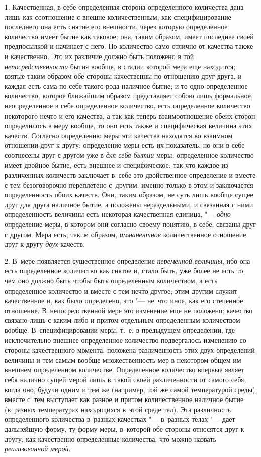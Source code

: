 1. Качественная, в себе определенная сторона определенного количества дана лишь
как соотношение с внешне количественным; как специфицирование последнего она
есть снятие его внешности, через которую определенное количество имеет бытие
как таковое; она, таким образом, имеет последнее своей предпосылкой и начинает
с него. Но количество само отлично от качества также и качественно. Это их
различие должно быть положено в той {\em непосредственности} бытия вообще, в
стадии которой мера еще находится; взятые таким образом обе стороны качественны
по отношению друг друга, и каждая есть сама по себе такого рода наличное бытие;
и то одно определенное количество, которое ближайшим образом представляет собою
лишь формальное, неопределенное в себе определенное количество, есть
определенное количество некоторого нечто и его качества, а так как теперь
взаимоотношение обеих сторон определилось в меру вообще, то оно есть также и
специфическая величина этих качеств. Согласно определению меры эти качества
находятся во взаимном отношении друг к другу; определение меры есть их
показатель; но они в себе соотнесены друг с другом уже в {\em для-себя-бытии}
меры; определенное количество имеет двойное бытие, есть внешнее и
специфическое, так что каждое из различенных количеств заключает в~себе это
двойственное определение и вместе с тем безоговорочно переплетено с~другим;
именно только в этом и заключается определенность обоих качеств. Они, таким
образом, не суть лишь вообще сущее друг для друга наличное бытие, а положены
нераздельными, и связанная с ними определенность величины есть некоторая
качественная единица, "--- {\em одно} определение меры, в котором они согласно
своему понятию, в себе, связаны друг с другом. Мера есть, таким образом,
{\em имманентное} количественное отношение друг к другу {\em двух} качеств.

2. В~мере появляется существенное определение {\em переменной величины}, ибо
она есть определенное количество как снятое и, стало быть, уже более не есть
то, чем оно должно быть чтобы быть определенным количеством, а есть
определенное количество и вместе с тем нечто другое; этим другим служит
качественное и, как было определено, это "--- не~что иное, как его
степенн\'{о}е отношение. В~непосредственной мере это изменение еще не положено;
качество связано лишь с каким-либо и притом отдельным определенным количеством
вообще. В~специфицировании меры, т.~е. в предыдущем определении, где
исключительно внешнее определенное количество подвергалось изменению со стороны
качественного момента, положена различенность этих двух определений величины и
тем самым вообще множественность мер в некотором общем им внешнем определенном
количестве. Определенное количество впервые являет себя налично сущей мерой
лишь в~такой своей различенности от самого себя, когда оно, будучи одним и тем
же (например, той же самой температурой среды), вместе с~тем выступает как
разное и притом количественное наличное бытие (в~разных температурах
находящихся в~этой среде тел). Эта различность определенного количества
в~разных качествах "--- в~разных телах "--- дает дальнейшую форму, ту форму
меры, в~которой обе стороны относятся друг к другу, как качественно
определенные количества, чт\'{о} можно назвать {\em реализованной мерой}.

